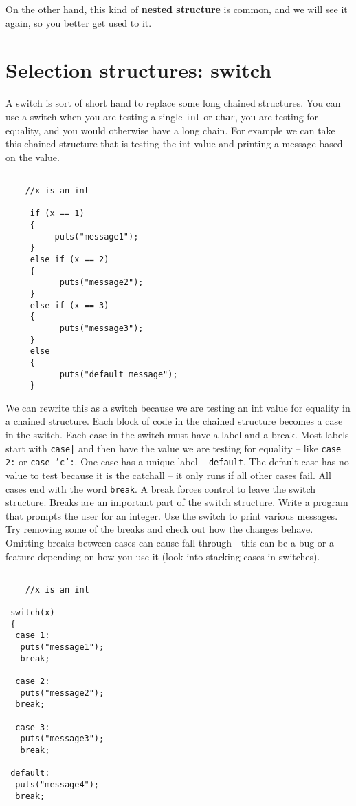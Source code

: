 On the other hand, this kind of {\bf nested structure} is common, and
we will see it again, so you better get used to it.


\section{Selection structures: switch}

A switch is sort of short hand to replace some long chained structures. 
You can use a switch when you are testing a single {\tt int} or {\tt char}, you
are testing for equality, and you would otherwise have a long chain. For example we can take this chained structure that is testing the 
int value and printing a message based on the value.

\begin{verbatim}
	
	//x is an int
	
	 if (x == 1) 
	 {
		  puts("message1");
	 } 
	 else if (x == 2) 
	 {
		   puts("message2");
	 } 
	 else if (x == 3) 
	 {
		   puts("message3");
	 } 
	 else 
	 {
		   puts("default message");
	 }
\end{verbatim}
%

We can rewrite this as a switch because we are testing an int value for equality in a chained structure. Each block of code in the chained structure 
becomes a case in the switch. Each case in the switch must have a label and a break. Most labels start with {\tt case|} and then have the value we are testing for equality --
like {\tt case 2:} or {\tt case 'c':}. One case has a unique label -- {\tt default}. The default case has no value to test because it is the catchall -- it only runs if all other cases fail. All cases end with the word {\tt break}. A break forces control to leave the switch structure. Breaks are an important part of the switch structure.
Write a program that prompts the user for an integer. Use the switch to print various messages. Try removing some of the breaks and  check out how the changes behave.
Omitting breaks between cases can cause fall through - this can be a bug or a feature depending on how you use it (look into stacking cases in switches).


\begin{verbatim}
	
	//x is an int
	
 switch(x)
 {
  case 1:
   puts("message1");
   break;

  case 2:
   puts("message2");
  break;

  case 3:
   puts("message3");
   break;

 default:
  puts("message4");
  break;
		
	\end{verbatim}

